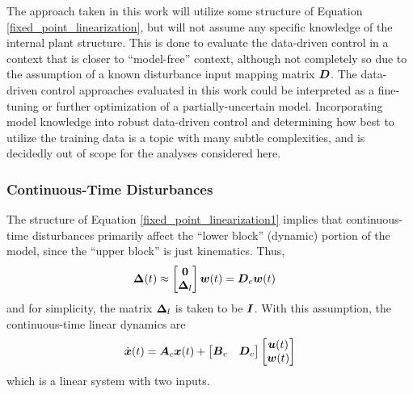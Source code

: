 The approach taken in this work will utilize some structure of Equation \eqref{fixed_point_linearization}, but will not assume any specific knowledge of the internal plant structure.  This is done to evaluate the data-driven control in a context that is closer to ``model-free'' context, although not completely so due to the assumption of a known disturbance input mapping matrix $\vb*{D}$.  The data-driven control approaches evaluated in this work could be interpreted as a fine-tuning or further optimization of a partially-uncertain model.  Incorporating model knowledge into robust data-driven control and determining how best to utilize the training data is a topic with many subtle complexities, and is decidedly out of scope for the analyses considered here.

\subsubsection{Continuous-Time Disturbances}
The structure of Equation \eqref{fixed_point_linearization1} implies that continuous-time disturbances primarily affect the ``lower block'' (dynamic) portion of the model, since the ``upper block'' is just kinematics.  Thus, 
\begin{equation}
\label{eq-continuous-disturbances}
\begin{aligned}
	 \vb*{\Delta}(t) &\approx
	\begin{bmatrix}
		\vb*{0}\\
		\vb*{\Delta}_{l}\\
	\end{bmatrix} \vb*{w}(t)
	= \vb*{D}_{c} \vb*{w}(t)
\end{aligned}
\end{equation}
and for simplicity, the matrix $\vb*{\Delta}_{l}$ is taken to be $\vb*{I}$.  With this assumption, the continuous-time linear dynamics are
\begin{equation}
\label{fixed_point_linearization}
\begin{aligned}
	\dot{\vb*{x}}(t) &= \vb*{A}_{c}\vb*{x}(t) + \begin{bmatrix} \vb*{B}_{c} & \vb*{D}_{c} \end{bmatrix} \begin{bmatrix} \vb*{u}(t)\\ \vb*{w}(t) \end{bmatrix}\\
\end{aligned}
\end{equation}
which is a linear system with two inputs.

